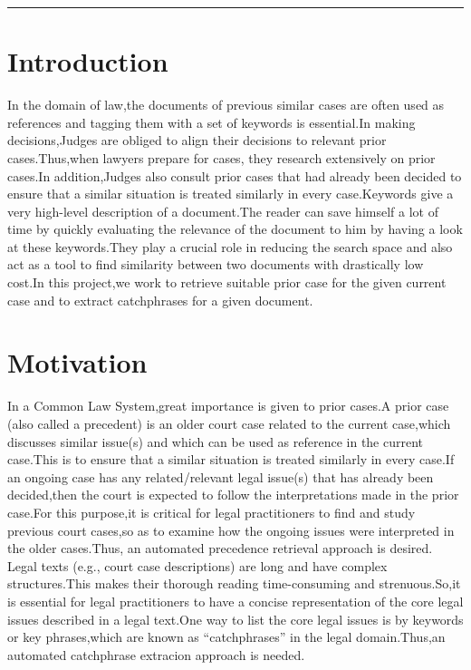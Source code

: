\documentclass[12pt,a4paper]{article}
\begin{document}
\reviewtitle
\hrule

\section{Introduction}
In the domain of law,the documents of previous similar cases are often used as references and tagging them with a set of keywords is essential.In making decisions,Judges are obliged to align their decisions to relevant prior cases.Thus,when lawyers prepare for cases, they research extensively on prior cases.In addition,Judges also consult prior cases that had already been decided to ensure that a similar situation is treated similarly in every case.Keywords give a very high-level description of a document.The reader can save himself a lot of time by quickly evaluating the relevance of the document to him by having a look at these keywords.They play a crucial role in reducing the search space and also act as a tool to find similarity between two documents with drastically low cost.In this project,we  work to retrieve suitable prior case for the given current case and to extract catchphrases for a given document.


\section{Motivation}
In a Common Law System,great importance is given to prior cases.A prior case (also called a precedent) is an older court case related to the current case,which discusses similar issue(s) and which can be used as reference in the current case.This is to ensure that a similar situation is treated similarly in every case.If an ongoing case has any related/relevant legal issue(s) that has already been decided,then the court is expected to follow the interpretations made in the prior case.For this purpose,it is critical for legal practitioners to find and study previous court cases,so as to examine how the ongoing issues were interpreted in the older cases.Thus, an automated precedence retrieval approach is desired.
\\Legal texts (e.g., court case descriptions) are long and have complex structures.This makes their thorough reading time-consuming and strenuous.So,it is essential for legal practitioners to have a concise representation of the core legal issues described in a legal text.One way to list the core legal issues is by keywords or key phrases,which are known as “catchphrases” in the legal domain.Thus,an automated catchphrase extracion approach is needed.
\end{document}
